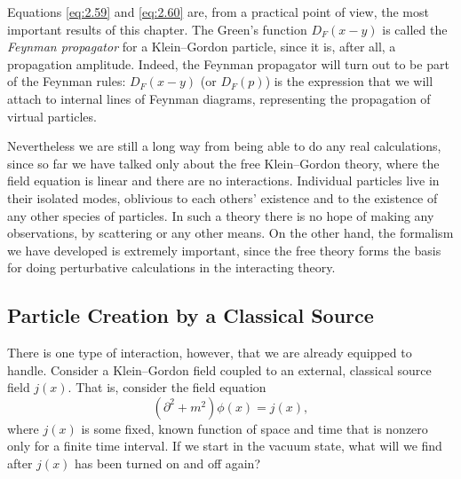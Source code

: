 Equations \eqref{eq:2.59} and \eqref{eq:2.60} are, from a practical point
of view, the most important results of this chapter.  The Green's function
$D_F(x-y)$ is called the \emph{Feynman propagator} for a Klein--Gordon
particle, since it is, after all, a propagation amplitude.  Indeed, the
Feynman propagator will turn out to be part of the Feynman rules:
$D_F(x-y)$ (or $D_F(p)$) is the expression that we will attach to internal
lines of Feynman diagrams, representing the propagation of virtual
particles.

Nevertheless we are still a long way from being able to do any real
calculations, since so far we have talked only about the free Klein--Gordon
theory, where the field equation is linear and there are no interactions.
Individual particles live in their isolated modes, oblivious to each
others' existence and to the existence of any other species of particles.
In such a theory there is no hope of making any observations, by scattering
or any other means.  On the other hand, the formalism we have developed is
extremely important, since the free theory forms the basis for doing
perturbative calculations in the interacting theory.

\subsection{Particle Creation by a Classical Source}

There is one type of interaction, however, that we are already equipped to
handle.  Consider a Klein--Gordon field coupled to an external, classical
source field $j(x)$.  That is, consider the field equation
\begin{equation}
  (\partial^2 + m^2)\phi(x) = j(x),
  \label{eq:2.61}
\end{equation}
where $j(x)$ is some fixed, known function of space and time that is
nonzero only for a finite time interval.  If we start in the vacuum state,
what will we find after $j(x)$ has been turned on and off again?

